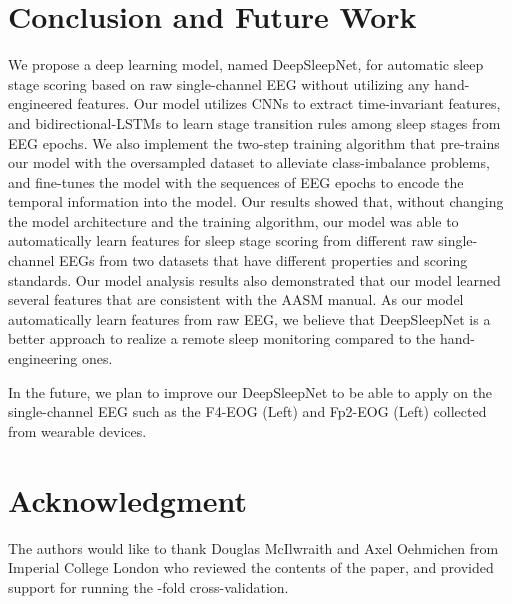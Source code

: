 \documentclass[journal,twoside]{IEEEtran}
\begin{document}
\section{Conclusion and Future Work}
We propose a deep learning model, named DeepSleepNet, for automatic sleep stage scoring based on raw single-channel EEG without utilizing any hand-engineered features. Our model utilizes CNNs to extract time-invariant features, and bidirectional-LSTMs to learn stage transition rules among sleep stages from EEG epochs. We also implement the two-step training algorithm that pre-trains our model with the oversampled dataset to alleviate class-imbalance problems, and fine-tunes the model with the sequences of EEG epochs to encode the temporal information into the model.
Our results showed that, without changing the model architecture and the training algorithm, our model was able to automatically learn features for sleep stage scoring from different raw single-channel EEGs from two datasets that have different properties and scoring standards.
Our model analysis results also demonstrated that our model learned several features that are consistent with the AASM manual. As our model automatically learn features from raw EEG, we believe that DeepSleepNet is a better approach to realize a remote sleep monitoring compared to the hand-engineering ones.

In the future, we plan to improve our DeepSleepNet to be able to apply on the single-channel EEG such as the F4-EOG (Left) and Fp2-EOG (Left) collected from wearable devices. 













\section*{Acknowledgment}
The authors would like to thank Douglas McIlwraith and Axel Oehmichen from Imperial College London who reviewed the contents of the paper, and provided support for running the -fold cross-validation.


\ifCLASSOPTIONcaptionsoff
  \newpage
\fi










\end{document}
